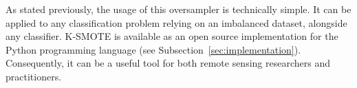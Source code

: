 \documentclass[parskip=full]{scrartcl}
\begin{document}
As stated previously, the usage of this oversampler is technically simple. It
can be applied to any classification problem relying on an imbalanced dataset,
alongside any classifier. K-SMOTE is available as an open source implementation
for the Python programming language (see Subsection~\ref{sec:implementation}).
Consequently, it can be a useful tool for both remote sensing researchers and
practitioners.



\end{document}
